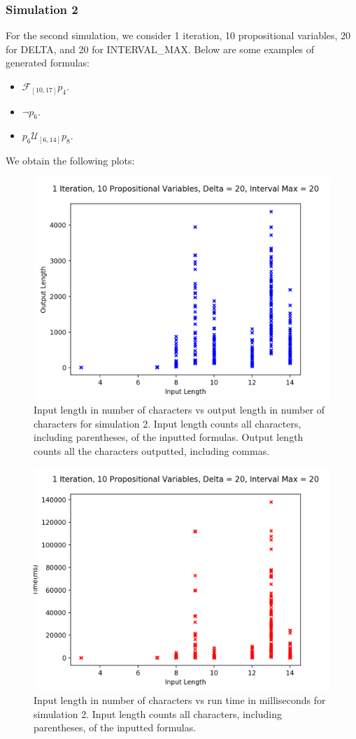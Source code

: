 \documentclass[runningheads]{llncs}
\begin{document}
\subsubsection{Simulation 2}
For the second simulation, we consider 1 iteration, 10 propositional variables, 20 for DELTA, and 20 for INTERVAL\_MAX. Below are some examples of generated formulas:
\begin{itemize}
    \item $\mathcal{F}_{[10,17]} p_4$.
    \item $\neg p_6$.
    \item $p_6 \mathcal{U}_{[6,14]} p_8$.
\end{itemize}
We obtain the following plots:
\begin{figure}[H]
    \centering
    \includegraphics[scale=0.75]{images/Sim2Length.png}
    \caption{Input length in number of characters vs output length in number of characters for simulation 2. Input length counts all characters, including parentheses, of the inputted formulas. Output length counts all the characters outputted, including commas.}
\end{figure}
\begin{figure}[H]
    \centering
    \includegraphics[scale=0.75]{images/Sim2Time.png}
    \caption{Input length in number of characters vs run time in milliseconds for simulation 2. Input length counts all characters, including parentheses, of the inputted formulas.}
\end{figure}
\end{document}
